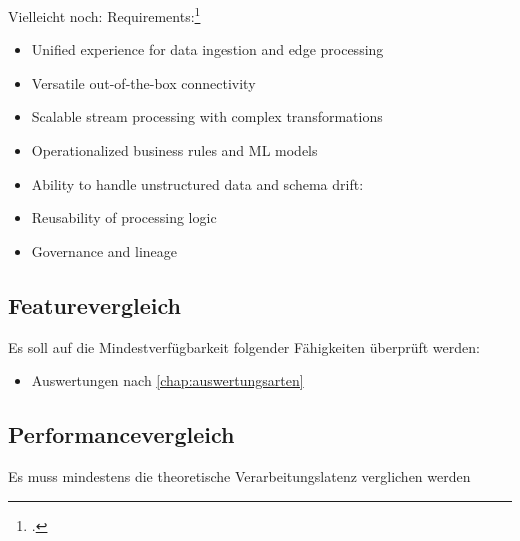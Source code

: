 


Vielleicht noch:
Requirements:\footcite[Vgl.][]{Belur.2020}
\begin{itemize}
\item Unified experience for data ingestion and edge processing
\item Versatile out-of-the-box connectivity
\item Scalable stream processing with complex transformations
\item Operationalized business rules and ML models
\item Ability to handle unstructured data and schema drift:
\item Reusability of processing logic
\item Governance and lineage
\end{itemize}

\subsection{Featurevergleich}
Es soll auf die Mindestverfügbarkeit folgender Fähigkeiten überprüft werden:
\begin{itemize}
\item Auswertungen nach \autoref{chap:auswertungsarten}
\end{itemize}

\subsection{Performancevergleich}
Es muss mindestens die theoretische Verarbeitungslatenz verglichen werden

